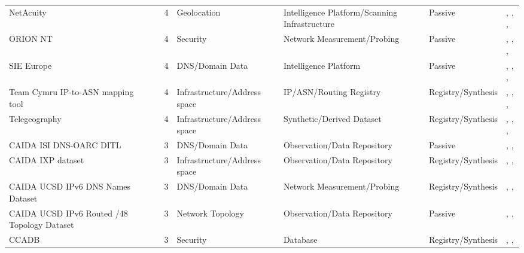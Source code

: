 \begin{table}[h!]
\begin{tabular}{lllllll}
NetAcuity & \cite{netacuity} & 4 & Geolocation & Intelligence Platform/Scanning Infrastructure & Passive & \cite{10.1145/3517745.3561425}, \cite{10.1145/3487552.3487822}, \cite{10.1007/978-3-030-72582-2_4}, \cite{10.1007/978-3-030-98785-5_29} \\
ORION NT & \cite{orion-nt} & 4 & Security & Network Measurement/Probing & Passive & \cite{10.1145/3646547.3689012}, \cite{10.1145/3646547.3688451}, \cite{10.1145/3618257.3624818}, \cite{10.1145/3777912.3839831} \\
SIE Europe & \cite{sie-europe} & 4 & DNS/Domain Data & Intelligence Platform & Passive & \cite{10.1145/3646547.3689017}, \cite{10.1007/978-3-031-56249-5_9}, \cite{10.1007/978-3-031-56249-5_10}, \cite{10.1145/3777912.3809157} \\
Team Cymru IP-to-ASN mapping tool & \cite{team-cymru-ip-asn} & 4 & Infrastructure/Address space & IP/ASN/Routing Registry & Registry/Synthesis & \cite{10.1145/3487552.3487854}, \cite{10.1007/978-3-031-28486-1_10}, \cite{10.1007/978-3-031-85960-1_18}, \cite{10.1145/3777912.3839811} \\
Telegeography & \cite{telegeography} & 4 & Infrastructure/Address space & Synthetic/Derived Dataset & Registry/Synthesis & \cite{10.1145/3517745.3561443}, \cite{10.1007/978-3-030-98785-5_29}, \cite{10.1145/3777912.3809135}, \cite{10.1145/3777912.3839834} \\
CAIDA ISI DNS-OARC DITL & \cite{caida-ditl} & 3 & DNS/Domain Data & Observation/Data Repository & Passive & \cite{10.1007/978-3-030-72582-2_32}, \cite{10.1007/978-3-031-28486-1_21}, \cite{10.1145/3777912.3839813} \\
CAIDA IXP dataset & \cite{caida-ixp-dataset} & 3 & Infrastructure/Address space & Observation/Data Repository & Registry/Synthesis & \cite{10.1145/3487552.3487854}, \cite{10.1007/978-3-030-98785-5_29}, \cite{10.1145/3777912.3809137} \\
CAIDA UCSD IPv6 DNS Names Dataset & \cite{caida-dns-names} & 3 & DNS/Domain Data & Network Measurement/Probing & Registry/Synthesis & \cite{10.1145/3646547.3688449}, \cite{10.1007/978-3-031-85960-1_2}, \cite{10.1007/978-3-031-85960-1_3} \\
CAIDA UCSD IPv6 Routed /48 Topology Dataset & \cite{caida-ipv6-routed-48} & 3 & Network Topology & Observation/Data Repository & Passive & \cite{10.1145/3487552.3487829}, \cite{10.1007/978-3-031-56252-5_10}, \cite{10.1145/3646547.3688449} \\
CCADB & \cite{ccadb} & 3 & Security & Database & Registry/Synthesis & \cite{10.1145/3646547.3688415}, \cite{10.1145/3618257.3624815}, \cite{10.1145/3777912.3839820} \\

\end{tabular}
\end{table}
